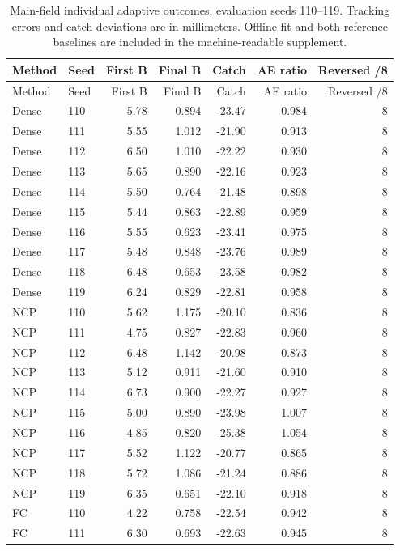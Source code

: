 \begin{longtable}{llrrrrr}
\caption{Main-field individual adaptive outcomes, evaluation seeds 110--119. Tracking errors and catch deviations are in millimeters. Offline fit and both reference baselines are included in the machine-readable supplement.}\label{tab:revision-seeds}\\
\toprule Method & Seed & First B & Final B & Catch & AE ratio & Reversed /8 \\ \midrule\endfirsthead
\toprule Method & Seed & First B & Final B & Catch & AE ratio & Reversed /8 \\ \midrule\endhead
Dense & 110 & 5.78 & 0.894 & -23.47 & 0.984 & 8 \\
Dense & 111 & 5.55 & 1.012 & -21.90 & 0.913 & 8 \\
Dense & 112 & 6.50 & 1.010 & -22.22 & 0.930 & 8 \\
Dense & 113 & 5.65 & 0.890 & -22.16 & 0.923 & 8 \\
Dense & 114 & 5.50 & 0.764 & -21.48 & 0.898 & 8 \\
Dense & 115 & 5.44 & 0.863 & -22.89 & 0.959 & 8 \\
Dense & 116 & 5.55 & 0.623 & -23.41 & 0.975 & 8 \\
Dense & 117 & 5.48 & 0.848 & -23.76 & 0.989 & 8 \\
Dense & 118 & 6.48 & 0.653 & -23.58 & 0.982 & 8 \\
Dense & 119 & 6.24 & 0.829 & -22.81 & 0.958 & 8 \\
NCP & 110 & 5.62 & 1.175 & -20.10 & 0.836 & 8 \\
NCP & 111 & 4.75 & 0.827 & -22.83 & 0.960 & 8 \\
NCP & 112 & 6.48 & 1.142 & -20.98 & 0.873 & 8 \\
NCP & 113 & 5.12 & 0.911 & -21.60 & 0.910 & 8 \\
NCP & 114 & 6.73 & 0.900 & -22.27 & 0.927 & 8 \\
NCP & 115 & 5.00 & 0.890 & -23.98 & 1.007 & 8 \\
NCP & 116 & 4.85 & 0.820 & -25.38 & 1.054 & 8 \\
NCP & 117 & 5.52 & 1.122 & -20.77 & 0.865 & 8 \\
NCP & 118 & 5.72 & 1.086 & -21.24 & 0.886 & 8 \\
NCP & 119 & 6.35 & 0.651 & -22.10 & 0.918 & 8 \\
FC & 110 & 4.22 & 0.758 & -22.54 & 0.942 & 8 \\
FC & 111 & 6.30 & 0.693 & -22.63 & 0.945 & 8 \\

\end{longtable}
